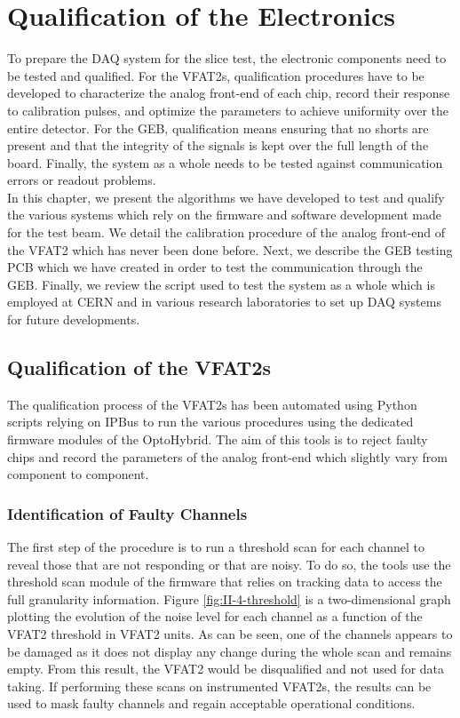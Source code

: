 \chapter{Qualification of the Electronics}
\label{chap:II-4-qualification}

  To prepare the DAQ system for the slice test, the electronic components need to be tested and qualified. For the VFAT2s, qualification procedures have to be developed to characterize the analog front-end of each chip, record their response to calibration pulses, and optimize the parameters to achieve uniformity over the entire detector. For the GEB, qualification means ensuring that no shorts are present and that the integrity of the signals is kept over the full length of the board. Finally, the system as a whole needs to be tested against communication errors or readout problems. \\

  In this chapter, we present the algorithms we have developed to test and qualify the various systems which rely on the firmware and software development made for the test beam. We detail the calibration procedure of the analog front-end of the VFAT2 which has never been done before. Next, we describe the GEB testing PCB which we have created in order to test the communication through the GEB. Finally, we review the script used to test the system as a whole which is employed at CERN and in various research laboratories to set up DAQ systems for future developments.

  \section{Qualification of the VFAT2s}

    The qualification process of the VFAT2s has been automated using Python scripts relying on IPBus to run the various procedures using the dedicated firmware modules of the OptoHybrid. The aim of this tools is to reject faulty chips and record the parameters of the analog front-end which slightly vary from component to component.

    \subsection{Identification of Faulty Channels}

      The first step of the procedure is to run a threshold scan for each channel to reveal those that are not responding or that are noisy. To do so, the tools use the threshold scan module of the firmware that relies on tracking data to access the full granularity information. Figure \ref{fig:II-4-threshold} is a two-dimensional graph plotting the evolution of the noise level for each channel as a function of the VFAT2 threshold in VFAT2 units. As can be seen, one of the channels appears to be damaged as it does not display any change during the whole scan and remains empty. From this result, the VFAT2 would be disqualified and not used for data taking. If performing these scans on instrumented VFAT2s, the results can be used to mask faulty channels and regain acceptable operational conditions.

